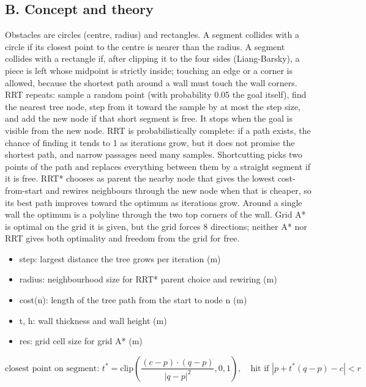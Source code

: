 \documentclass[11pt,a4paper]{article}
\begin{document}
\subsection*{B. Concept and theory}
Obstacles are circles (centre, radius) and rectangles. A segment collides with a circle if its closest point to the centre is nearer than the radius. A segment collides with a rectangle if, after clipping it to the four sides (Liang-Barsky), a piece is left whose midpoint is strictly inside; touching an edge or a corner is allowed, because the shortest path around a wall must touch the wall corners. RRT repeats: sample a random point (with probability 0.05 the goal itself), find the nearest tree node, step from it toward the sample by at most the step size, and add the new node if that short segment is free. It stops when the goal is visible from the new node. RRT is probabilistically complete: if a path exists, the chance of finding it tends to 1 as iterations grow, but it does not promise the shortest path, and narrow passages need many samples. Shortcutting picks two points of the path and replaces everything between them by a straight segment if it is free. RRT* chooses as parent the nearby node that gives the lowest cost-from-start and rewires neighbours through the new node when that is cheaper, so its best path improves toward the optimum as iterations grow. Around a single wall the optimum is a polyline through the two top corners of the wall. Grid A* is optimal on the grid it is given, but the grid forces 8 directions; neither A* nor RRT gives both optimality and freedom from the grid for free.

\begin{itemize}[nosep]
\item step: largest distance the tree grows per iteration (m)
\item radius: neighbourhood size for RRT* parent choice and rewiring (m)
\item cost(n): length of the tree path from the start to node n (m)
\item t, h: wall thickness and wall height (m)
\item res: grid cell size for grid A* (m)
\end{itemize}

\begin{equation*}
\text{closest point on segment: } t^*=\mathrm{clip}\!\left(\frac{(c-p)\cdot(q-p)}{|q-p|^2},0,1\right),\quad \text{hit if } |p+t^*(q-p)-c|<r
\end{equation*}
\end{document}
